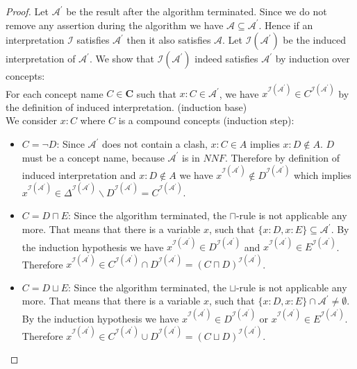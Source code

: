 \documentclass[a4paper,11pt]{scrartcl}
\theoremstyle{break}
\theoremstyle{definition}
\begin{document}
\begin{proof}
Let $\mathcal{A}^\prime$ be the result after the algorithm terminated. Since we do not remove any assertion during the algorithm we have $\mathcal{A}\subseteq\mathcal{A}^\prime$. Hence if an interpretation $\mathcal{I}$ satisfies $\mathcal{A}^\prime$ then it also satisfies $\mathcal{A}$. Let $\mathcal{I}(\mathcal{A}^\prime)$ be the induced interpretation of $\mathcal{A}^\prime$. We show that $\mathcal{I}(\mathcal{A}^\prime)$ indeed satisfies $\mathcal{A}^\prime$ by induction over concepts:\\
For each concept name $C\in\mathbf{C}$ such that $x:C\in\mathcal{A}^\prime$, we have $x^{\mathcal{I}(\mathcal{A}^\prime)}\in C^{\mathcal{I}(\mathcal{A}^\prime)}$ by the definition of induced interpretation. (induction base)\\
We consider $x:C$ where $C$ is a compound concepts (induction step):
\begin{itemize}
\item $C=\neg D$: Since $\mathcal{A}^\prime$ does not contain a clash, $x:C\in A$ implies $x:D\notin A$. $D$ must be a concept name, because $\mathcal{A}^\prime$ is in $NNF$. Therefore by definition of induced interpretation and $x:D\notin A$ we have $x^{\mathcal{I}(\mathcal{A}^\prime)}\notin D^{\mathcal{I}(\mathcal{A}^\prime)}$ which implies $x^{\mathcal{I}(\mathcal{A}^\prime)}\in \Delta^{\mathcal{I}(\mathcal{A}^\prime)}\backslash D^{\mathcal{I}(\mathcal{A}^\prime)}=C^{\mathcal{I}(\mathcal{A}^\prime)}$.
\item $C=D\sqcap E$: Since the algorithm terminated, the $\sqcap$-rule is not applicable any more. That means that there is a variable $x$, such that $\{x:D, x:E\}\subseteq \mathcal{A}^\prime$. By the induction hypothesis we have $x^{\mathcal{I}(\mathcal{A}^\prime)}\in D^{\mathcal{I}(\mathcal{A}^\prime)}$ and $x^{\mathcal{I}(\mathcal{A}^\prime)}\in E^{\mathcal{I}(\mathcal{A}^\prime)}$. Therefore $x^{\mathcal{I}(\mathcal{A}^\prime)}\in C^{\mathcal{I}(\mathcal{A}^\prime)}\cap D^{\mathcal{I}(\mathcal{A}^\prime)}=(C\sqcap D)^{\mathcal{I}(\mathcal{A}^\prime)}$.
\item $C=D\sqcup E$: Since the algorithm terminated, the $\sqcup$-rule is not applicable any more. That means that there is a variable $x$, such that $\{x:D, x:E\}\cap \mathcal{A}^\prime\neq \emptyset$. By the induction hypothesis we have $x^{\mathcal{I}(\mathcal{A}^\prime)}\in D^{\mathcal{I}(\mathcal{A}^\prime)}$ or $x^{\mathcal{I}(\mathcal{A}^\prime)}\in E^{\mathcal{I}(\mathcal{A}^\prime)}$. Therefore $x^{\mathcal{I}(\mathcal{A}^\prime)}\in C^{\mathcal{I}(\mathcal{A}^\prime)}\cup D^{\mathcal{I}(\mathcal{A}^\prime)}=(C\sqcup D)^{\mathcal{I}(\mathcal{A}^\prime)}$.

\end{itemize}
\end{proof}
\end{document}
